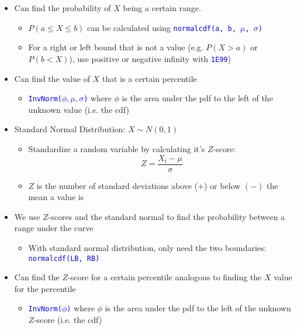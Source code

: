\documentclass{article}
\begin{document}
\begin{itemize}
\begin{itemize}
\begin{figure}[h!]
	\end{figure}
	\item Can find the probability of $X$ being a certain range.
	\begin{itemize}
		\item $P(a \leq X \leq b)$ can be calculated using \textcolor{blue}{\texttt{normalcdf(a, b, $\mu$, $\sigma$)}}
		\item For a right or left bound that is not a value (e.g. $P(X > a)$ or $P(b < X)$), use positive or negative infinity with \textcolor{blue}{\texttt{1E99}})
	\end{itemize}
	\item Can find the value of $X$ that is a certain percentile
	\begin{itemize}
		\item \textcolor{blue}{\texttt{InvNorm($\phi, \mu, \sigma$)}} where $\phi$ is the area under the pdf to the left of the unknown value (i.e. the cdf)	
	\end{itemize}
	\item Standard Normal Distribution: $X \sim N(0,1)$
	\begin{itemize}
		\item Standardize a random variable by calculating it's $Z$-score:
		\begin{equation*}
		Z=\frac{X_i - \mu}{\sigma}	
		\end{equation*}
		\item $Z$ is the number of standard deviations above ($+$) or below $(-)$ the mean a value is
		\end{itemize}
		\item We use $Z$-scores and the standard normal to find the probability between a range under the curve
		\begin{itemize}
			\item With standard normal distribution, only need the two boundaries: \textcolor{blue}{\texttt{normalcdf(LB, RB)}}
		\end{itemize}
		\item Can find the $Z$-score for a certain percentile analogous to finding the $X$ value for the percentile 
	\begin{itemize}
		\item \textcolor{blue}{\texttt{InvNorm($\phi$)}} where $\phi$ is the area under the pdf to the left of the unknown $Z$-score (i.e. the cdf)	
	\end{itemize}
	\end{itemize}


\end{itemize}
\end{document}
